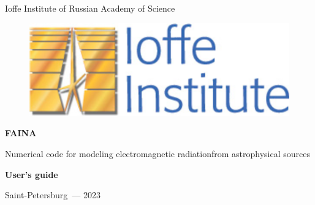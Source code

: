 \thispagestyle{empty}



\begin{center}
{
Ioffe Institute of Russian Academy of Science\\
}
\end{center}

\begin{figure}
	\centering
	\includegraphics[width=5.5 cm]{./fig/ioffe.png} 
\end{figure}



\vspace{5mm}
\begin{center}
{\bf \Huge FAINA
\par}
\vspace{10mm}
Numerical code for modeling electromagnetic radiationfrom astrophysical sources

\vspace{10mm}
{\bf \large User's guide \par}
\end{center}




\vspace{120mm}
\begin{center}
{Saint-Petersburg~--- 2023}
\end{center}

\newpage